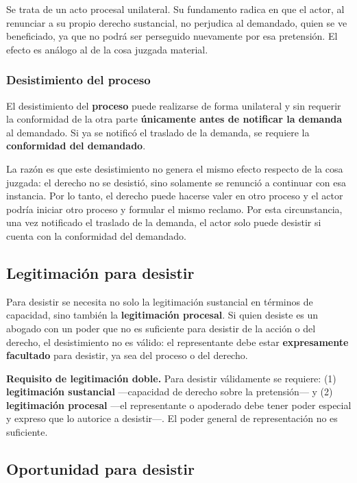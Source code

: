 \documentclass[12pt,oneside]{book}
\begin{document}
Se trata de un acto procesal unilateral. Su fundamento radica en que el actor, al renunciar a su propio derecho sustancial, no perjudica al demandado, quien se ve beneficiado, ya que no podrá ser perseguido nuevamente por esa pretensión. El efecto es análogo al de la cosa juzgada material.

\subsubsection{Desistimiento del proceso}

El desistimiento del \textbf{proceso} puede realizarse de forma unilateral y sin requerir la conformidad de la otra parte \textbf{únicamente antes de notificar la demanda} al demandado. Si ya se notificó el traslado de la demanda, se requiere la \textbf{conformidad del demandado}.

La razón es que este desistimiento no genera el mismo efecto respecto de la cosa juzgada: el derecho no se desistió, sino solamente se renunció a continuar con esa instancia. Por lo tanto, el derecho puede hacerse valer en otro proceso y el actor podría iniciar otro proceso y formular el mismo reclamo. Por esta circunstancia, una vez notificado el traslado de la demanda, el actor solo puede desistir si cuenta con la conformidad del demandado.

\subsection{Legitimación para desistir}

Para desistir se necesita no solo la legitimación sustancial en términos de capacidad, sino también la \textbf{legitimación procesal}. Si quien desiste es un abogado con un poder que no es suficiente para desistir de la acción o del derecho, el desistimiento no es válido: el representante debe estar \textbf{expresamente facultado} para desistir, ya sea del proceso o del derecho.

\begin{important}
\textbf{Requisito de legitimación doble.} Para desistir válidamente se requiere: (1) \textbf{legitimación sustancial} ---capacidad de derecho sobre la pretensión--- y (2) \textbf{legitimación procesal} ---el representante o apoderado debe tener poder especial y expreso que lo autorice a desistir---. El poder general de representación no es suficiente.
\end{important}

\subsection{Oportunidad para desistir}
\end{document}
